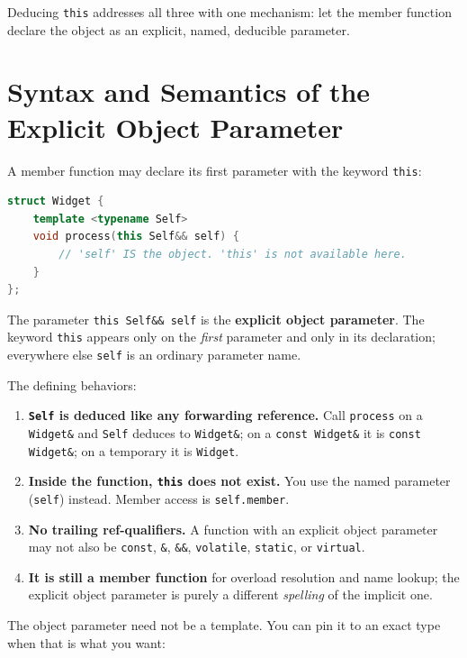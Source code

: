 Deducing \lstinline|this| addresses all three with one mechanism: let the member function declare the object as an explicit, named, deducible parameter.

\section{Syntax and Semantics of the Explicit Object Parameter}

A member function may declare its first parameter with the keyword \lstinline|this|:

\begin{lstlisting}[language=C++, caption={Declaring an explicit object parameter}]
struct Widget {
    template <typename Self>
    void process(this Self&& self) {
        // 'self' IS the object. 'this' is not available here.
    }
};
\end{lstlisting}

The parameter \lstinline|this Self&& self| is the \textbf{explicit object parameter}. The keyword \lstinline|this| appears only on the \emph{first} parameter and only in its declaration; everywhere else \lstinline|self| is an ordinary parameter name.

The defining behaviors:

\begin{enumerate}
    \item \textbf{\lstinline|Self| is deduced like any forwarding reference.} Call \lstinline|process| on a \lstinline|Widget&| and \lstinline|Self| deduces to \lstinline|Widget&|; on a \lstinline|const Widget&| it is \lstinline|const Widget&|; on a temporary it is \lstinline|Widget|.
    \item \textbf{Inside the function, \lstinline|this| does not exist.} You use the named parameter (\lstinline|self|) instead. Member access is \lstinline|self.member|.
    \item \textbf{No trailing ref-qualifiers.} A function with an explicit object parameter may not also be \lstinline|const|, \lstinline|&|, \lstinline|&&|, \lstinline|volatile|, \lstinline|static|, or \lstinline|virtual|.
    \item \textbf{It is still a member function} for overload resolution and name lookup; the explicit object parameter is purely a different \emph{spelling} of the implicit one.
\end{enumerate}

The object parameter need not be a template. You can pin it to an exact type when that is what you want:

